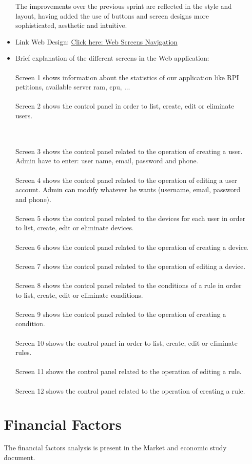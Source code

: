 \documentclass[11pt,a4paper]{article}
\begin{document}
\begin{itemize}
The improvements over the previous sprint are reflected in the style and layout, having added the use of buttons and screen designs more sophisticated, aesthetic and intuitive. 

\item Link Web Design:\newline\newline
 \textcolor{blue}{\href{https://drive.google.com/open?id=1O2AmtC1dJX7Pf473Isi73ArwLkCy9E7a}{Click here: Web Screens Navigation}}
 \item Brief explanation of the different screens in the Web application: 
\\ \\
Screen 1 shows information about the statistics of our application like RPI petitions, available server ram, cpu, ...
\\ \\
Screen 2 shows the control panel in order to list, create, edit or eliminate users.

\\ \\
Screen 3 shows the control panel related to the operation of creating a user. Admin have to enter: user name, email, password and phone.
\\ \\
Screen 4 shows the control panel related to the operation of editing a user account. Admin can modify whatever he wants (username, email, password and phone). 
\\ \\
Screen 5 shows the control panel related to the devices for each user in order to list, create, edit or eliminate devices. 
\\ \\
Screen 6 shows the control panel related to the operation of creating a device.
\\ \\
Screen 7 shows the control panel related to the operation of editing a device.
\\ \\
Screen 8 shows the control panel related to the conditions of a rule in order to list, create, edit or eliminate conditions.
\\ \\
Screen 9 shows the control panel related to the operation of creating a condition.
\\ \\
Screen 10 shows the control panel in order to list, create, edit or eliminate rules.
\\ \\
Screen 11 shows the control panel related to the operation of editing a rule.
\\ \\
Screen 12 shows the control panel related to the operation of creating a rule.

\end{itemize}
\section{Financial Factors}
The financial factors analysis is present in the Market and economic study document.
\end{document}

